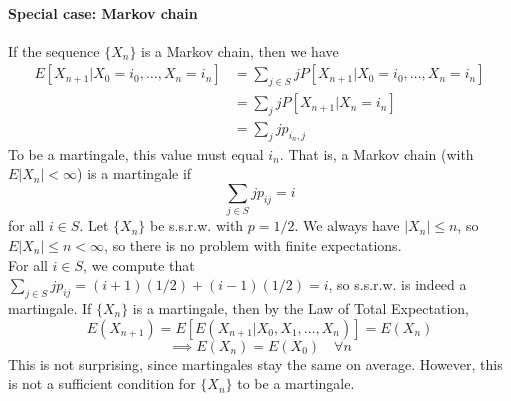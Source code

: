 \documentclass[11pt]{article}
\begin{document}
    \paragraph{Special case: Markov chain}
    If the sequence $\{X_n\}$ is a Markov chain, then we have
    \begin{align*}
    	E[X_{n+1} | X_0 = i_0, \hdots, X_n = i_n] &= \sum_{j \in S}jP[X_{n+1} | X_0 = i_0, \hdots, X_n = i_n]\\
    	&= \sum_{j}jP[X_{n+1} |X_n = i_n] \\
    	&= \sum_{j}jp_{i_n,j}
    \end{align*}
    To be a martingale, this value must equal $i_n$. That is, a Markov chain (with $E|X_n| < \infty$) is a martingale if
    $$\sum_{j \in S}jp_{ij} = i$$ for all $i \in S$.
    Let $\{X_n\}$ be s.s.r.w. with $p = 1/2$. We always have $|X_n| \leq n$, so $E|X_n| \leq n < \infty$, so there is no problem with finite expectations.\\
    For all $i \in S$, we compute that $\sum_{j \in S}jp_{ij} = (i+1)(1/2) + (i-1)(1/2) = i$, so s.s.r.w. is indeed a martingale.
    \proposition If $\{X_n\}$ is a martingale, then by the Law of Total Expectation,
    $$E(X_{n+1}) = E[E(X_{n+1}|X_0, X_1, \hdots, X_n)] = E(X_n)$$
    $$\implies E(X_n) = E(X_0) \quad \forall n$$
    This is not surprising, since martingales stay the same on average. However, this is not a sufficient condition for $\{X_n\}$ to be a martingale.
\end{document}
